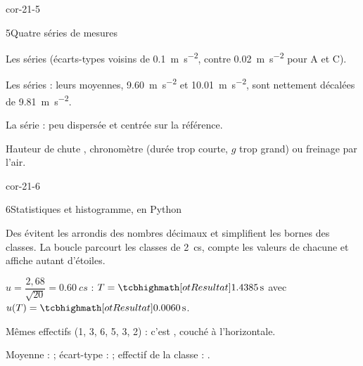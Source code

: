 \begin{blocLivre}{cor-21-5}
\begin{corrige}{5}{Quatre séries de mesures}
\begin{questions}
\item Les séries  (écarts-types voisins de \qty{0,1}{m.s^{-2}}, contre \qty{0,02}{m.s^{-2}} pour A et C).
\item Les séries  : leurs moyennes, \qty{9,60}{m.s^{-2}} et \qty{10,01}{m.s^{-2}}, sont nettement décalées de \qty{9,81}{m.s^{-2}}.
\item La série  : peu dispersée et centrée sur la référence.
\item Hauteur de chute , chronomètre  (durée trop courte, $g$ trop grand) ou freinage par l'air.
\end{questions}
\end{corrige}
\end{blocLivre}
\begin{blocLivre}{cor-21-6}
\begin{corrige}{6}{Statistiques et histogramme, en Python}
\begin{questions}
\item Des  évitent les arrondis des nombres décimaux et simplifient les bornes des classes. La boucle parcourt les classes
de \qty{2}{cs}, compte les valeurs de chacune et affiche autant d'étoiles.
\item $u=\dfrac{2{,}68}{\sqrt{20}}=\qty{0,60}{cs}$ : $T=\res{\qty{1,4385}{s}}$ avec $u(T)=\res{\qty{0,0060}{s}}$.
\item Mêmes effectifs (1, 3, 6, 5, 3, 2) : c'est , couché à l'horizontale.
\item Moyenne :  ; écart-type :  ;\newline
effectif de la classe : .
\end{questions}
\end{corrige}
\end{blocLivre}
